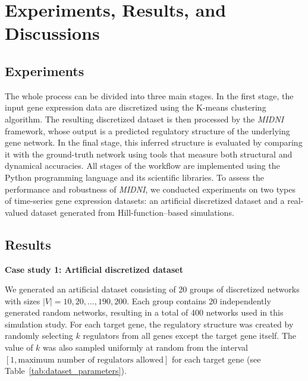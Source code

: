 \section{Experiments, Results, and Discussions}\label{chapter2_result}
\subsection{Experiments}The whole process can be divided into three main stages.  
In the first stage, the input gene expression data are discretized using the K-means clustering algorithm.  
The resulting discretized dataset is then processed by the \textit{MIDNI} framework, whose output is a predicted regulatory structure of the underlying gene network. In the final stage, this inferred structure is evaluated by comparing it with the ground-truth network using tools that measure both structural and dynamical accuracies. All stages of the workflow are implemented using the Python programming language and its scientific libraries. To assess the performance and robustness of \textit{MIDNI}, we conducted experiments on two types of time-series gene expression datasets: an artificial discretized dataset and a real-valued dataset generated from Hill-function–based simulations. 

\subsection{Results} \label{sec:results}
\noindent\textbf{Case study 1: Artificial discretized dataset}\par
We generated an artificial dataset consisting of 20 groups of discretized networks with sizes 
$|V| = 10, 20, \ldots, 190, 200$.  
Each group contains 20 independently generated random networks, resulting in a total of 400 networks used in this simulation study.  
For each target gene, the regulatory structure was created by randomly selecting $k$ regulators from all genes except the target gene itself.  
The value of $k$ was also sampled uniformly at random from the interval $[1, \text{maximum number of regulators allowed}]$ for each target gene (see Table~\ref{tab:dataset_parameters}).

